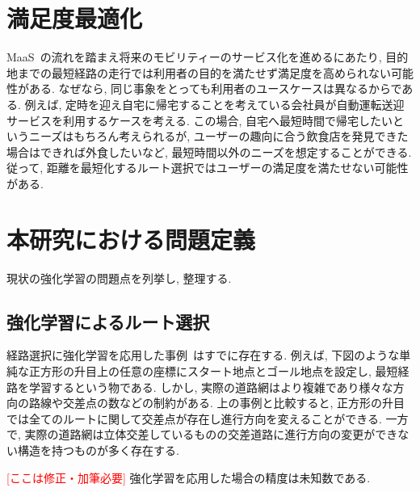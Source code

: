   
\section{満足度最適化}

MaaS~\cite{MaaS}の流れを踏まえ将来のモビリティーのサービス化を進めるにあたり, 目的地までの最短経路の走行では利用者の目的を満たせず満足度を高められない可能性がある.
なぜなら, 同じ事象をとっても利用者のユースケースは異なるからである. 例えば, 定時を迎え自宅に帰宅することを考えている会社員が自動運転送迎サービスを利用するケースを考える.
この場合, 自宅へ最短時間で帰宅したいというニーズはもちろん考えられるが, ユーザーの趣向に合う飲食店を発見できた場合はできれば外食したいなど, 最短時間以外のニーズを想定することができる.
従って, 距離を最短化するルート選択ではユーザーの満足度を満たせない可能性がある.


\section{本研究における問題定義}

現状の強化学習の問題点を列挙し, 整理する.

\subsection{強化学習によるルート選択}

経路選択に強化学習を応用した事例~\cite{DQNRouteSimple}はすでに存在する. 例えば, 下図のような単純な正方形の升目上の任意の座標にスタート地点とゴール地点を設定し, 最短経路を学習するという物である. 
しかし, 実際の道路網はより複雑であり様々な方向の路線や交差点の数などの制約がある. 上の事例と比較すると, 正方形の升目では全てのルートに関して交差点が存在し進行方向を変えることができる. 一方で,
実際の道路網は立体交差しているものの交差道路に進行方向の変更ができない構造を持つものが多く存在する.

\textcolor{red}{[ここは修正・加筆必要]}
強化学習を応用した場合の精度は未知数である.

